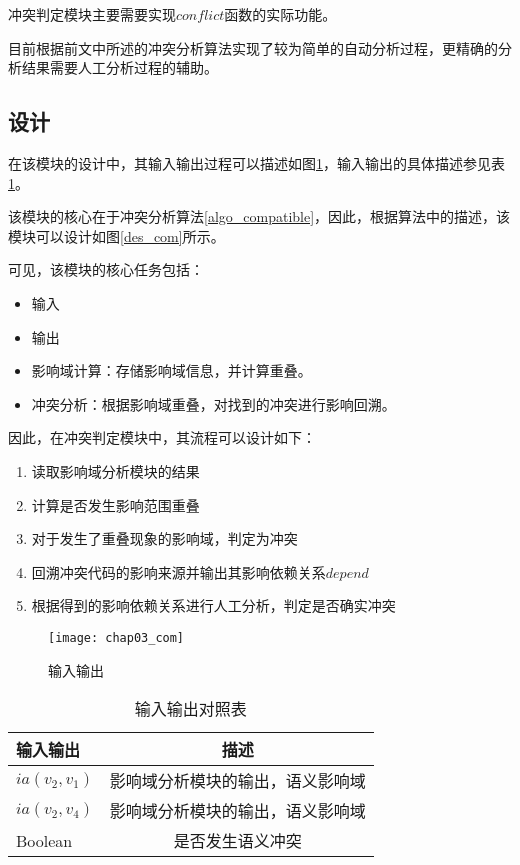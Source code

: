 冲突判定模块主要需要实现$conflict$函数的实际功能。

目前根据前文中所述的冲突分析算法实现了较为简单的自动分析过程，更精确的分析结果需要人工分析过程的辅助。

\subsection{设计}

在该模块的设计中，其输入输出过程可以描述如图\ref {com}，输入输出的具体描述参见表\ref {com_io}。

该模块的核心在于冲突分析算法\ref {algo_compatible}，因此，根据算法中的描述，该模块可以设计如图\ref {des_com}所示。

可见，该模块的核心任务包括：
\begin{itemize}
	\item 输入
	\item 输出
	\item 影响域计算：存储影响域信息，并计算重叠。
	\item 冲突分析：根据影响域重叠，对找到的冲突进行影响回溯。
\end{itemize}


因此，在冲突判定模块中，其流程可以设计如下：
\begin{enumerate}
	\item 读取影响域分析模块的结果
	\item 计算是否发生影响范围重叠
	\item 对于发生了重叠现象的影响域，判定为冲突
	\item 回溯冲突代码的影响来源并输出其影响依赖关系$depend$
	\item 根据得到的影响依赖关系进行人工分析，判定是否确实冲突
\end{enumerate}

\begin{figure}[H]
	\centering
	\texttt{[image: chap03\_com]}
	\caption {输入输出}
	\label {com}	
\end{figure}

\begin{table}[H]
	\caption{输入输出对照表}
	\label{com_io}
	\centering
	\begin{tabular}{lc}
		\toprule[1.5pt]
		{\heiti 输入输出} & {\heiti 描述} \\\midrule[1pt]
		$ia(v_2,v_1)$ & 影响域分析模块的输出，语义影响域 \\
		$ia(v_2,v_4)$ & 影响域分析模块的输出，语义影响域 \\
		Boolean & 是否发生语义冲突\\
		\bottomrule[1.5pt]
	\end{tabular}
\end{table}


